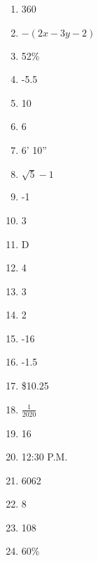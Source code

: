 \documentclass[../uilmath.tex]{subfiles}
\begin{document}
\begin{enumerate}[label=\bfseries\arabic*.]
    \item %
    360

    \item %
    $-(2x-3y-2)$

    \item %
    52\%

    \item %
    -5.5

    \item %
    10

    \item %
    6

    \item %
    6' 10''

    \item %
    $\sqrt{5}-1$

    \item %
    -1

    \item %
    3

    \item %
    D 

    \item %
    4

    \item %
    3 

    \item %
    2 

    \item %
    -16 

    \item %
    -1.5 

    \item %
    \$10.25 

    \item %
    $\frac{1}{2020}$

    \item %
    16

    \item %
    12:30 P.M.

    \item %
    6062

    \item %
    8

    \item %
    108

    \item %
    60\% 


\end{enumerate}
\end{document}
